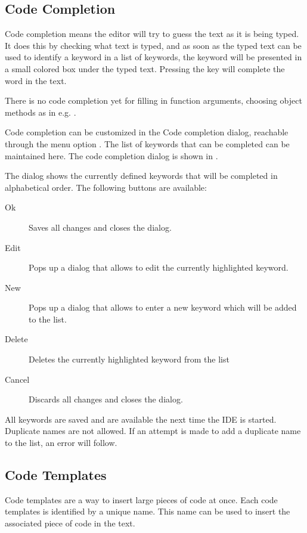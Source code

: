 \subsection{Code Completion}
\label{se:codecompletion}
Code completion means the editor will try to guess the text as it
is being typed. It does this by checking what text is typed, and as soon
as the typed text can be used to identify a keyword in a list of keywords,
the keyword will be presented in a small colored box under the typed text. 
Pressing the  key will complete the word in the text.

There is no code completion yet for filling in function arguments, choosing
object methods as in e.g. \delphi.

Code completion can be customized in the Code completion dialog, reachable 
through the menu option .
The list of keywords that can be completed can be maintained here. 
The code completion dialog is shown in .


The dialog shows the currently defined keywords that will be completed in
alphabetical order.
The following buttons are available:
\begin{description}
\item[Ok] Saves all changes and closes the dialog.
\item[Edit] Pops up a dialog that allows to edit the currently 
highlighted keyword.
\item[New] Pops up a dialog that allows to enter a new keyword which will be
added to the list.
\item[Delete] Deletes the currently highlighted keyword from the list
\item[Cancel] Discards all changes and closes the dialog.
\end{description}
All keywords are saved and are available the next time the IDE is started.
Duplicate names are not allowed. If an attempt is made to add a duplicate
name to the list, an error will follow.

\subsection{Code Templates}
Code templates are a way to insert large pieces of code at once. Each 
code templates is identified by a unique name. This name can be used to
insert the associated piece of code in the text.

